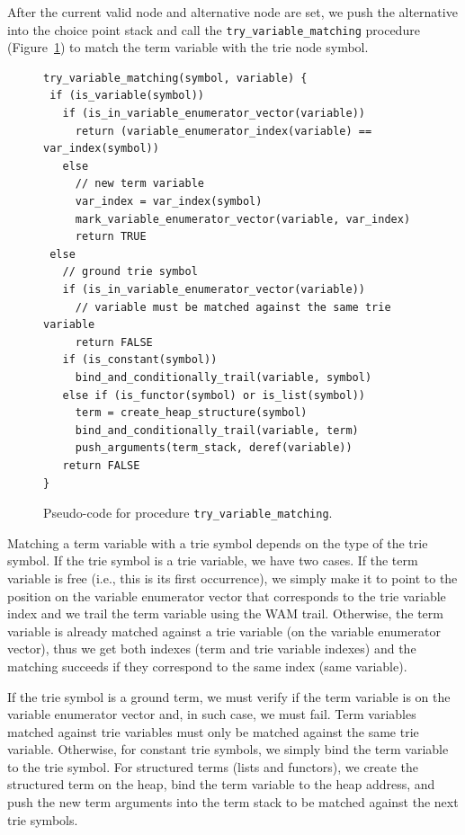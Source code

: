 After the current valid node and alternative node are set, we push the
alternative into the choice point stack and call the
\texttt{try\_variable\_matching} procedure (Figure~\ref{fig:try_variable_matching})
to match the term variable with the trie node symbol.

\begin{figure}[!ht]
\begin{Verbatim}
try_variable_matching(symbol, variable) {
 if (is_variable(symbol))
   if (is_in_variable_enumerator_vector(variable))
     return (variable_enumerator_index(variable) == var_index(symbol))
   else
     // new term variable
     var_index = var_index(symbol)
     mark_variable_enumerator_vector(variable, var_index)
     return TRUE
 else
   // ground trie symbol
   if (is_in_variable_enumerator_vector(variable))
     // variable must be matched against the same trie variable
     return FALSE
   if (is_constant(symbol))
     bind_and_conditionally_trail(variable, symbol)
   else if (is_functor(symbol) or is_list(symbol))
     term = create_heap_structure(symbol)
     bind_and_conditionally_trail(variable, term)
     push_arguments(term_stack, deref(variable))
   return FALSE
}
\end{Verbatim}
\caption{Pseudo-code for procedure \texttt{try\_variable\_matching}.}
\label{fig:try_variable_matching}
\end{figure}

Matching a term variable with a trie symbol depends on the type of the
trie symbol. If the trie symbol is a trie variable, we have two cases.
If the term variable is free (i.e., this is its first occurrence), we
simply make it to point to the position on the variable enumerator
vector that corresponds to the trie variable index and we trail the
term variable using the WAM trail. Otherwise, the term variable is
already matched against a trie variable (on the variable enumerator
vector), thus we get both indexes (term and trie variable indexes) and
the matching succeeds if they correspond to the same index (same
variable).

If the trie symbol is a ground term, we must verify if the term
variable is on the variable enumerator vector and, in such case, we
must fail. Term variables matched against trie variables must only be
matched against the same trie variable. Otherwise, for constant trie
symbols, we simply bind the term variable to the trie symbol. For
structured terms (lists and functors), we create the structured term
on the heap, bind the term variable to the heap address, and push the
new term arguments into the term stack to be matched against the next
trie symbols.

